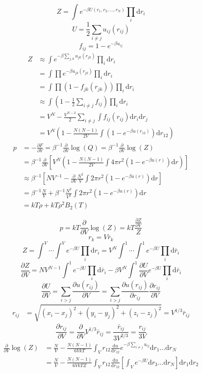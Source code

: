 \documentclass[letterpaper]{article}
\def\d{\mathrm{d}}
\begin{document}
\begin{multicols}{2}
\[
Z=\int e^{-\beta U(r_1,r_2,\dots,r_N)}\prod_i\d r_i
\]
\[
U=\frac{1}{2}\sum_{i\neq j}u_{ij}(r_{ij})
\]
\[
f_{ij}=1-e^{-\beta u_{ij}}
\]
\begin{align*}
Z&\approx\int e^{-\beta\sum_{j,k}u_{jk}(r_{jk})}\prod_i\d r_i\\
&=\int\prod e^{-\beta u_{jk}(r_{jk})}\prod_i\d r_i\\
&=\int\prod(1-f_{jk}(r_{jk}))\prod_i\d r_i\\
&\approx\int\left(1-\frac{1}{2}\sum_{i\neq j}f_{ij}\right)\prod_i\d r_i\\
&=V^N-\frac{V^{N-2}}{2}\sum_{i\neq j}\int f_{ij}(r_{ij})\d r_i\d r_j\\
&=V^N\left(1-\frac{N(N-1)}{2V}\int\left(1-e^{-\beta u(r_{12})}\right)\d
r_{12}\right)
\end{align*}
\begin{align*}
p&=-\frac{\partial F}{\partial V}=\beta^{-1}\frac{\partial}{\partial V}\log(Q)
=\beta^{-1}\frac{\partial}{\partial V}\log(Z)\\
&=\beta^{-1}\frac{\partial}{\partial V}\left[
V^N\left(1-\frac{N(N-1)}{2V}\int4\pi r^2\left(1-e^{-\beta u(r)}\right)\d
r\right)\right]\\
&\approx\beta^{-1}\left[NV^{-1}-\frac{\partial}{\partial V}\frac{N^2}{V}
\int2\pi r^2\left(1-e^{-\beta u(r)}\right)\d r\right]\\
&=\beta^{-1}\frac{N}{V}+\beta^{-1}\frac{N^2}{V^2}
\int2\pi r^2\left(1-e^{-\beta u(r)}\right)\d r\\
&=kT\rho+kT\rho^2 B_2(T)
\end{align*}

\[
p=kT\frac{\partial}{\partial V}\log(Z)=kT\frac{\frac{\partial Z}{\partial V}}{Z}
\]
\[
r_k=V\bar r_k
\]
\[
Z=\int^V\cdots\int^Ve^{-\beta U}\prod_i\d r_i
=V^N\int^1\cdots\int^1e^{-\beta U}\prod_i\d\bar r_i
\]
\[
\frac{\partial Z}{\partial V}=NV^{N-1}\int^1e^{-\beta U}\prod_i\d\bar r_i
-\beta V^N\int^1\frac{\partial U}{\partial V}e^{-\beta U}\prod_i\d\bar r_i
\]
\[
\frac{\partial U}{\partial V}=\sum_{i>j}\frac{\partial u(r_{ij})}{\partial V}
=\sum_{i>j}\frac{\partial u(r_{ij})}{\partial r_{ij}}\frac{\partial
r_{ij}}{\partial V}
\]
\begin{align*}
r_{ij}&=\sqrt{(x_i-x_j)^2+(y_i-y_j)^2+(z_i-z_j)^2}=V^{1/3}\bar r_{ij}
\end{align*}
\[
\frac{\partial r_{ij}}{\partial V}
=\frac{\partial}{\partial V}V^{1/3}\bar r_{ij}
=\frac{\bar r_{ij}}{3V^{2/3}}
=\frac{r_{ij}}{3V}
\]
\begin{align*}
\frac{\partial}{\partial V}\log(Z)&=\frac{N}{V}-\frac{N(N-1)}{6VkT}
\int_V r_{12}\frac{\d u}{\d r_{12}}e^{-\beta\sum_{i\neq j}u_{ij}}
\d r_1\dots\d r_N\\
&=\frac{N}{V}-\frac{N(N-1)}{6VkTZ}\int_Vr_{12}\frac{\d u}{\d r_{12}}
\left[\int_Ve^{-\beta U}\d r_3\dots\d r_N\right]\d r_1\d r_2
\end{align*}


\end{multicols}
\end{document}
